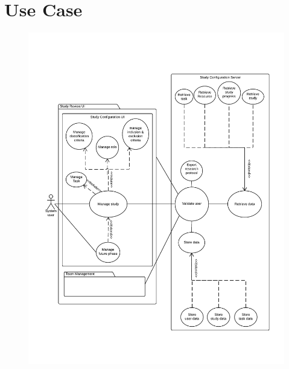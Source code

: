 \section{Use Case}

\begin{figure}[h!]
  \includegraphics{section/UseCaseDiagram}
  \label{fig:Use Case 1}
\end{figure}